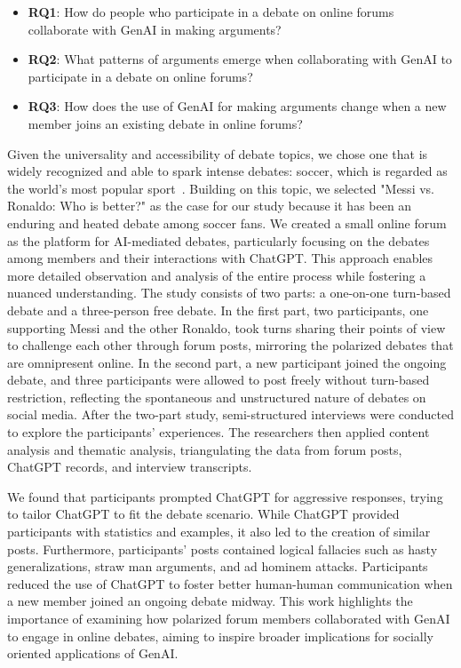 \begin{itemize}
\item{\textbf{RQ1}: How do people who participate in a debate on online forums collaborate with GenAI in making arguments?}

\item{\textbf{RQ2}: What patterns of arguments emerge when collaborating with GenAI to participate in a debate on online forums?}

\item{\textbf{RQ3}: How does the use of GenAI for making arguments change when a new member joins an existing debate in online forums?}
\end{itemize}

Given the universality and accessibility of debate topics, we chose one that is widely recognized and able to spark intense debates: soccer, which is regarded as the world's most popular sport~\cite{stolen_physiology_2005}. Building on this topic, we selected "Messi vs. Ronaldo: Who is better?" as the case for our study because it has been an enduring and heated debate among soccer fans. We created a small online forum as the platform for AI-mediated debates, particularly focusing on the debates among members and their interactions with ChatGPT. This approach enables more detailed observation and analysis of the entire process while fostering a nuanced understanding. The study consists of two parts: a one-on-one turn-based debate and a three-person free debate. In the first part, two participants, one supporting Messi and the other Ronaldo, took turns sharing their points of view to challenge each other through forum posts, mirroring the polarized debates that are omnipresent online. In the second part, a new participant joined the ongoing debate, and three participants were allowed to post freely without turn-based restriction, reflecting the spontaneous and unstructured nature of debates on social media. After the two-part study, semi-structured interviews were conducted to explore the participants' experiences. The researchers then applied content analysis and thematic analysis, triangulating the data from forum posts, ChatGPT records, and interview transcripts.

We found that participants prompted ChatGPT for aggressive responses, trying to tailor ChatGPT to fit the debate scenario. While ChatGPT provided participants with statistics and examples, it also led to the creation of similar posts. Furthermore, participants' posts contained logical fallacies such as hasty generalizations, straw man arguments, and ad hominem attacks. Participants reduced the use of ChatGPT to foster better human-human communication when a new member joined an ongoing debate midway. This work highlights the importance of examining how polarized forum members collaborated with GenAI to engage in online debates, aiming to inspire broader implications for socially oriented applications of GenAI.